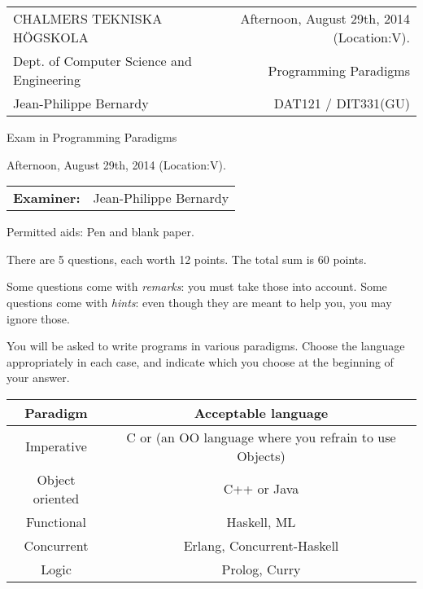 \documentclass{article}
\begin{document}
\setlength{\parskip}{2pt}

\newcommand{\examtime}{Afternoon, August 29th, 2014  (Location:V)}
\newcommand{\points}[1]{\marginpar{\bf #1 points}}
\noindent
\begin{tabular}{lr}
CHALMERS TEKNISKA H\"OGSKOLA &\examtime{}.\\
Dept. of Computer Science and Engineering & Programming Paradigms\\
Jean-Philippe Bernardy                 & DAT121 / DIT331(GU) \\
\end{tabular}

\vspace{2.5cm} \noindent
\begin{center} {\LARGE
Exam in Programming Paradigms}
\end{center}

\vspace{1.5cm}

\noindent
\examtime{}.\\
\begin{tabular}{ll}
\textbf{Examiner:} & Jean-Philippe Bernardy
\end{tabular}
\vspace{1cm}

\noindent
Permitted aids: Pen and blank paper.

There are 5 questions, each worth 12 points. The total sum is 60
points.

Some questions come with \emph{remarks}: you must take those
into account.
Some questions come with \emph{hints}: even though they are meant to help you, you may ignore those.

You will be asked to write programs in various paradigms. Choose the
language appropriately in each case, and indicate which you choose at
the beginning of your answer.

\begin{tabular}[p]{cc}
  Paradigm & Acceptable language \\ \hline
  Imperative   & C or (an OO language where you refrain to use Objects) \\
  Object oriented & C++ or Java \\
  Functional & Haskell, ML \\
  Concurrent & Erlang, Concurrent-Haskell \\
  Logic & Prolog, Curry
\end{tabular}
\end{document}
